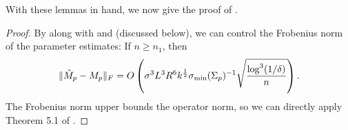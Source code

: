 With these lemmas in hand, we now give the proof of .
\begin{proof}
By  along with  and  (discussed below),
we can control the Frobenius norm of the parameter estimates:
If $n \ge n_1$, then
\begin{align}
  \|\hat M_p - M_p\|_F = O\left( \sigma^3 L^3 R^6 k^{\frac12} \sigma_\text{\rm min}(\Sigma_p)^{-1} \sqrt{\frac{\log^3 (1/\delta)}{n}} \right).
\end{align}
The Frobenius norm upper bounds the operator norm,
so we can directly apply Theorem 5.1 of \cite{AnandkumarGeHsu2012}.
\end{proof}

